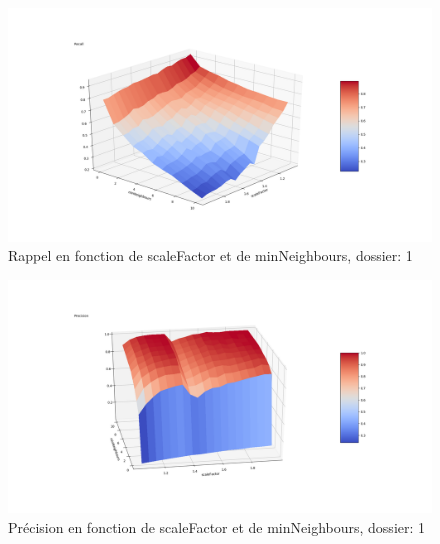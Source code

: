 \documentclass[a4paper,11pt]{article}
\begin{document}
	        \begin{figure}[H]
	            \begin{center}
	        	\includegraphics[scale = 0.4]{images/courbes/recall_fine_scale_dossier_1.png}
	        	\caption{Rappel en fonction de scaleFactor et de minNeighbours, dossier: 1}
	        	\label{fig:recall_fine_scale_dossier_1}
	            \end{center}
	        \end{figure}

	        \begin{figure}[H]
	            \begin{center}
	        	\includegraphics[scale = 0.4]{images/courbes/precision_fine_scale_dossier_1.png}
	        	\caption{Précision en fonction de scaleFactor et de minNeighbours, dossier: 1}
	        	\label{fig:precision_fine_scale_dossier_1}
	            \end{center}
	        \end{figure}
\end{document}
